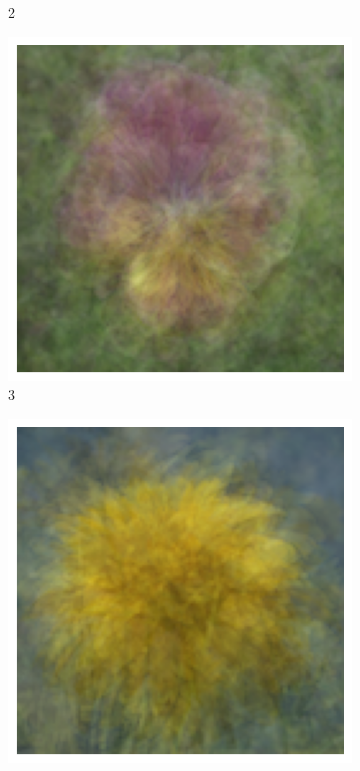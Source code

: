 \documentclass{article}
\begin{document}
\begin{figure}
\begin{subfigure}[b]{0.09\textwidth}
		\caption{2}
	\end{subfigure}
	\begin{subfigure}[b]{0.09\textwidth}
		\includegraphics[width= \textwidth]{ave3}
		\caption{3}
	\end{subfigure}
	\begin{subfigure}[b]{0.09\textwidth}
		\includegraphics[width= \textwidth]{ave4}

\end{subfigure}
\end{figure}
\end{document}
